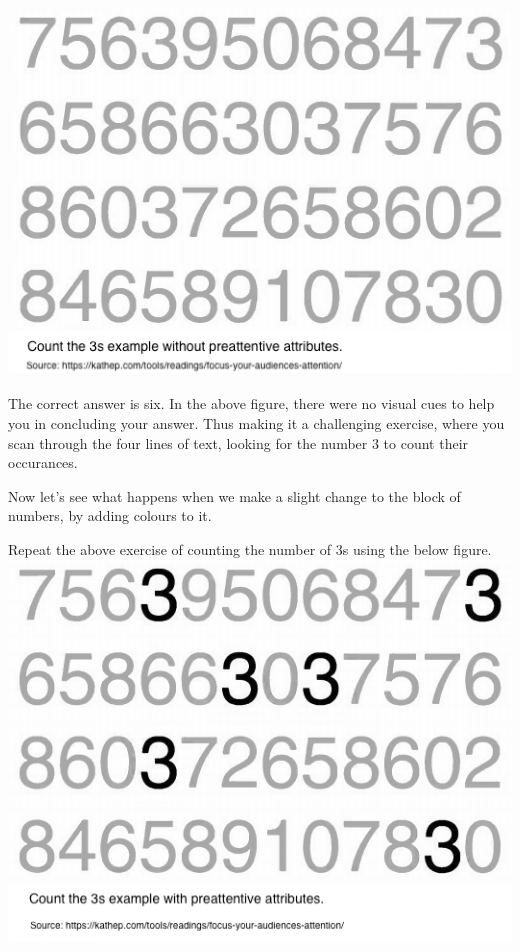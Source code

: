 \documentclass[]{book}
\begin{document}
\includegraphics{images/count_3_plain.png}

The correct answer is six. In the above figure, there were no visual cues to help you in concluding your answer. Thus making it a challenging exercise, where you scan through the four lines of text, looking for the number 3 to count their occurances.

Now let's see what happens when we make a slight change to the block of numbers, by adding colours to it.

Repeat the above exercise of counting the number of 3s using the below figure.\\

\includegraphics{images/count_3_coloured.png}
\end{document}
